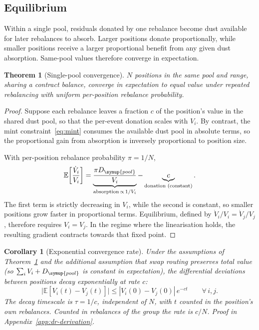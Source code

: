 \documentclass[11pt,a4paper]{article}
\theoremstyle{siphon}
\newtheorem{theorem}{Theorem}
\newtheorem{corollary}{Corollary}[theorem]
\begin{document}
\subsection{Equilibrium}\label{sec:equilibrium}

Within a single pool, residuals donated by one rebalance become dust available for later rebalances to absorb. Larger positions donate proportionally, while smaller positions receive a larger proportional benefit from any given dust absorption. Same-pool values therefore converge in expectation.

\begin{theorem}[Single-pool convergence]\label{thm:convergence}
$N$ positions in the same pool and range, sharing a contract balance, converge in expectation to equal value under repeated rebalancing with uniform per-position rebalance probability.
\end{theorem}

\begin{proof}
Suppose each rebalance leaves a fraction $c$ of the position's value in the shared dust pool, so that the per-event donation scales with $V_i$. By contrast, the mint constraint~\eqref{eq:mint} consumes the available dust pool in absolute terms, so the proportional gain from absorption is inversely proportional to position size.

With per-position rebalance probability $\pi = 1/N$,
\begin{equation}\label{eq:growth}
\mathbb{E}\biggl[\frac{\dot{V}_i}{V_i}\biggr]
=
\underbrace{\frac{\pi D_{\symup{pool}}}{V_i}}_{\text{absorption}\,\propto\,1/V_i}
-
\underbrace{c}_{\text{donation (constant)}}.
\end{equation}
The first term is strictly decreasing in $V_i$, while the second is constant, so smaller positions grow faster in proportional terms. Equilibrium, defined by $\dot{V}_i/V_i = \dot{V}_j/V_j$, therefore requires $V_i = V_j$. In the regime where the linearisation holds, the resulting gradient contracts towards that fixed point.
\end{proof}

\begin{corollary}[Exponential convergence rate]\label{cor:convergence-rate}
Under the assumptions of Theorem~\ref{thm:convergence} and the additional assumption that swap routing preserves total value (so $\sum_i V_i + D_{\symup{pool}}$ is constant in expectation), the differential deviations between positions decay exponentially at rate $c$:
\[
\bigl|\mathbb{E}[V_i(t) - V_j(t)]\bigr|
\leq
|V_i(0) - V_j(0)|\,e^{-ct}
\qquad \forall\, i,j.
\]
The decay timescale is $\tau = 1/c$, independent of $N$, with $t$ counted in the position's own rebalances. Counted in rebalances of the group the rate is $c/N$. Proof in Appendix~\ref{app:dr-derivation}.
\end{corollary}
\end{document}
